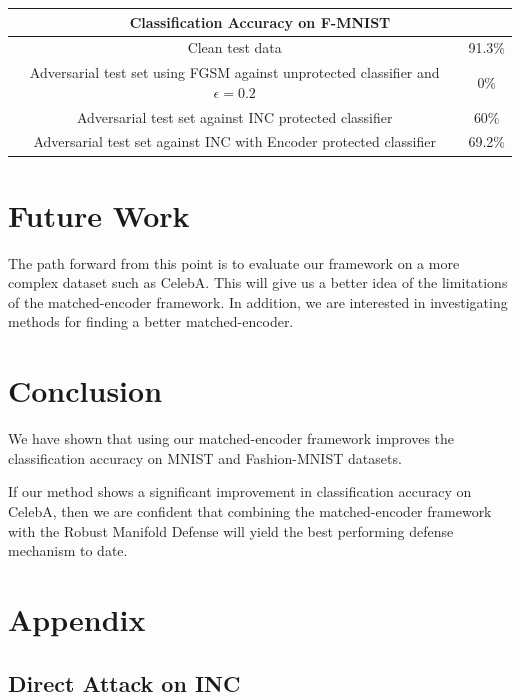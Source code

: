 \documentclass{article}
\theoremstyle{definition}
\begin{document}
\begin{center}
\begin{tabular}{ |c|c|}
\hline
  \multicolumn{2}{|c|}{Classification Accuracy on F-MNIST}\\
 \hline
 Clean test data & 91.3\% \\ 
 \hline
 Adversarial test set using FGSM against unprotected classifier and $\epsilon = 0.2$ & 0\% \\ 
 \hline
 Adversarial test set against INC protected classifier & 60\% \\ 
 \hline
 Adversarial test set against INC with Encoder protected classifier & 69.2\%\\
 \hline
\end{tabular}
\end{center}


\section{Future Work}
The path forward from this point is to evaluate our framework on a more
complex dataset such as CelebA. This will give us a better idea of the
limitations of the matched-encoder framework. In addition, we are
interested in investigating methods for finding a better matched-encoder.

\section{Conclusion}

We have shown that using our matched-encoder framework improves the
classification accuracy on MNIST and Fashion-MNIST datasets.

If our method shows a significant improvement in classification
accuracy on CelebA, then we are confident that combining the
matched-encoder framework with the Robust Manifold Defense will yield
the best performing defense mechanism to date.




\newpage

\section{Appendix}

\subsection{Direct Attack on INC}
\end{document}
